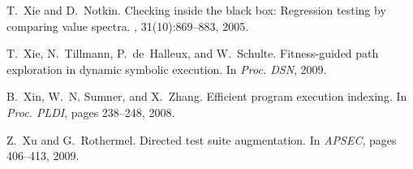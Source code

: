 \documentclass{llncs}
\begin{document}
{\begin{thebibliography}{10}
\begin{scriptsize}
T.~Xie and D.~Notkin.
\newblock Checking inside the black box: Regression testing by comparing value
  spectra.
, 31(10):869--883, 2005.

T.~Xie, N.~Tillmann, P.~de~Halleux, and W.~Schulte.
\newblock Fitness-guided path exploration in dynamic symbolic execution.
\newblock In {\em Proc. DSN}, 2009.

B.~Xin, W.~N. Sumner, and X.~Zhang.
\newblock Efficient program execution indexing.
\newblock In {\em Proc. PLDI}, pages 238--248, 2008.

Z.~Xu and G.~Rothermel.
\newblock Directed test suite augmentation.
\newblock In {\em APSEC}, pages 406--413, 2009.

\end{scriptsize}
\end{thebibliography}
}
\end{document}
